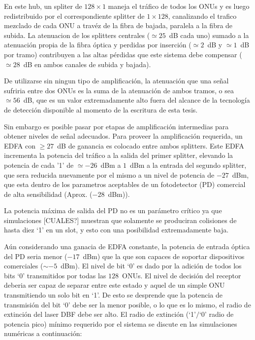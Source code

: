 En este hub, un spliter de $128\times 1$ maneja el tráfico de todos los ONUs y es luego redistribuido por el correspondiente splitter de $1\times 128$, canalizando el trafico mezclado de cada ONU a travéz de la fibra de bajada, paralela a la fibra de subida.
La atenuacion de los splitters centrales ($\simeq25$~dB cada uno) sumado a la atenuación propia de la fibra óptica y perdidas por inserción ($\simeq2$~dB y $\simeq1$~dB por tramo) contribuyen a las altas pérdidas que este sistema debe compensar ($\simeq28$~dB en ambos canales de subida y bajada).

De utilizarse sin ningun tipo de amplificación, la atenuación que una señal sufriria entre dos ONUs es la suma de la atenuación de ambos tramos, o sea $\simeq56$~dB, que es un valor extremadamente alto fuera del alcance de la tecnología de detección disponible al momento de la escritura de esta tesis.

Sin embargo es posible pasar por etapas de amplificación intermedias para obtener niveles de señal adecuados. Para proveer la amplificación requerida, un EDFA con $\geq27$~dB de ganancia es colocado entre ambos splitters. Este EDFA incrementa la potencia del tráfico a la salida del primer splitter, elevando la potencia de cada '1' de $\simeq-26$~dBm a $1$~dBm a la entrada del segundo splitter, que sera reducida nuevamente por el mismo a un nivel de potencia de $-27$~dBm, que esta dentro de los parametros aceptables de un fotodetector (PD) comercial de alta sensibilidad (Aprox. ($-28$~dBm)).

La potencia máxima de salida del PD no es un parámetro crítico ya que simulaciones [CUALES?] muestran que solamente se produciran colisiones de hasta diez `1' en un slot, y esto con una posibilidad extremadamente baja.

Aún considerando una ganacia de EDFA constante, la potencia de entrada óptica del PD seria menor ($-17$~dBm) que la que son capaces de soportar dispositivos comerciales ($\sim -5$~dBm).
El nivel de bit `0' es dado por la adición de todos los bits `0' transmitidos por todas las $128$~ONUs.
El nivel de decisión del receptor deberia ser capaz de separar entre este estado y aquel de un simple ONU transmitiendo un solo bit en `1'.
De esto se desprende que la potencia de transmisión del bit `0' debe ser la menor posible, o lo que es lo mismo, el radio de extinción del laser DBF debe ser alto.
El radio de extinción (`1'$/$`0' radio de potencia pico) mínimo requerido por el sistema se discute en las simulaciones numéricas a continuación:

